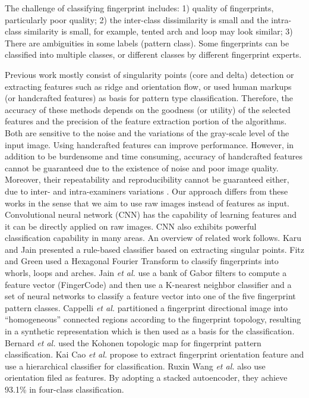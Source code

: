 
The challenge of classifying fingerprint includes: 
%
1) quality of fingerprints, particularly poor quality; 
%
2) the inter-class dissimilarity is small and the intra-class similarity is small, for example, tented arch and loop may look similar; 
%
3) There are ambiguities in some labels (pattern class). Some fingerprints can be classified into multiple classes, or different classes by different fingerprint experts.

Previous work mostly consist of singularity points (core and delta) detection or extracting features such as ridge and orientation flow, or used human markups (or handcrafted features) as basis for pattern type classification. 
%
Therefore, the accuracy of these methods depends on the goodness (or utility) of the selected features and the precision of the feature extraction portion of the algorithms. Both are sensitive to the noise and the variations of the gray-scale level of the input image.  
%
Using handcrafted features can improve performance.  However, in addition to be burdensome and time consuming, accuracy of handcrafted features cannot be guaranteed due to the existence of noise and poor image quality. 
%
Moreover, their repeatability and reproducibility cannot be guaranteed either, due to inter- and intra-examiners variations \cite{fbiBlackbox}.  
%
Our approach differs from these works in the sense that we aim to use raw images instead of features as input. Convolutional neural network (CNN) has the capability of learning features and it can be directly applied on raw images. CNN also exhibits powerful classification capability in many areas\cite{lecun2015deep}\cite{szegedy2016rethinking}.
%
An overview of related work follows. 
%
Karu and Jain \cite{karuJain1996} presented a rule-based classifier based on extracting singular points. 
%
Fitz and Green \cite{FitzGreen1996} used a Hexagonal Fourier Transform to classify fingerprints into whorls, loops and arches. 
%
Jain \textit{et al.} \cite{JainSalil1999} use a bank of Gabor filters to compute a feature vector (FingerCode) and then use a K-nearest neighbor classifier and a set of neural networks to classify a feature vector into one of the five fingerprint pattern classes.
%
Cappelli \textit{et al.} \cite{cappelli1999} partitioned a fingerprint directional image into ``homogeneous'' connected regions according to the fingerprint topology, resulting in a synthetic representation which is then used as a basis for the classification.
%
 Bernard \textit{et al.} \cite{Bernard2001} used the Kohonen topologic map for fingerprint pattern classification. 
%
Kai Cao \textit{et al.}\cite{cao2013fingerprint} propose to extract fingerprint orientation feature and use a hierarchical classifier for classification.
%
Ruxin Wang \textit{et al.} \cite{wang2014fingerprint} also use orientation filed as features. By adopting a stacked autoencoder, they achieve 93.1\% in four-class classification.
 
